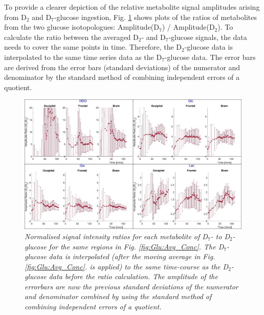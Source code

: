 To provide a clearer depiction of the relative metabolite signal amplitudes arising from D$_2$ and D$_7$-glucose ingestion, Fig. \ref{fig:Glu:D7_D2} shows plots of the ratios of metabolites from the two glucose isotopologues: Amplitude(D$_7$) / Amplitude(D$_2$). To calculate the ratio between the averaged D$_2$- and D$_7$-glucose signals, the data needs to cover the same points in time. Therefore, the D$_2$-glucose data is interpolated to the same time series data as the D$_7$-glucose data. The error bars are derived from the error bars (standard deviations) of the numerator and denominator by the standard method of combining independent errors of a quotient. 

\begin{figure}
    \centering
    \includegraphics[width = 1\textwidth]{Figures/Glucose/D7_D2.png}
    \caption{\textit{Normalised signal intensity ratios for each metabolite of D$_7$- to D$_2$-glucose for the same regions in Fig. \ref{fig:Glu:Avg_Conc}. The D$_7$-glucose data is interpolated (after the moving average in Fig. \ref{fig:Glu:Avg_Conc}. is applied) to the same time-course as the D$_2$-glucose data before the ratio calculation. The amplitude of the errorbars are now the previous standard deviations of the numerator and denominator combined by using the standard method of combining independent errors of a quotient.}}
    \label{fig:Glu:D7_D2}
\end{figure}

